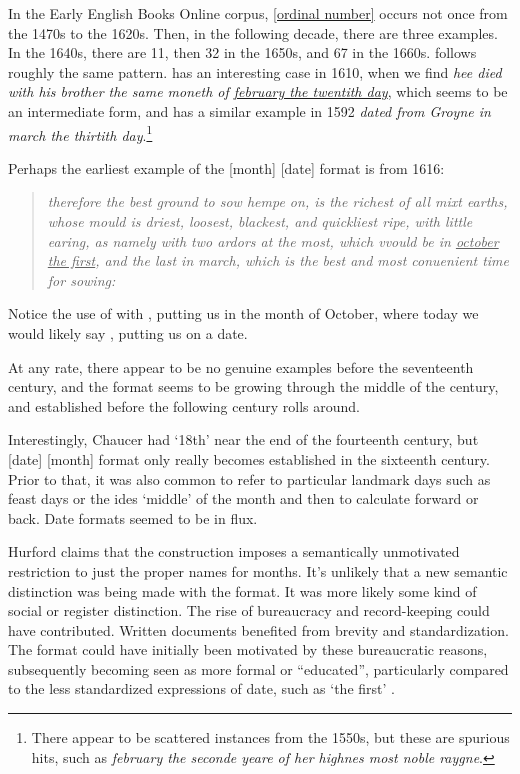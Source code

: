 In the Early English Books Online corpus, \uline{ [ordinal number]} occurs not once from the 1470s to the 1620s. Then, in the following decade, there are three examples. In the 1640s, there are 11, then 32 in the 1650s, and 67 in the 1660s.  follows roughly the same pattern.  has an interesting case in 1610, when we find \textit{hee died with his brother the same moneth of \uline{february the twentith day}}, which seems to be an intermediate form, and  has a similar example in 1592 \textit{dated from Groyne in march the thirtith day}.\footnote{There appear to be scattered instances from the 1550s, but these are spurious hits, such as \textit{february the seconde yeare of her highnes most noble raygne}.}

Perhaps the earliest example of the [month]  [date] format is from 1616: %

\begin{quote}
    \textit{therefore the best ground to sow hempe on, is the richest of all mixt earths, whose mould is driest, loosest, blackest, and quickliest ripe, with little earing, as namely with two ardors at the most, which vvould be in \uline{october the first}, and the last in march, which is the best and most conuenient time for sowing: }
\end{quote}

Notice the use of  with , putting us in the month of October, where today we would likely say , putting us on a date.

At any rate, there appear to be no genuine examples before the seventeenth century, and the format seems to be growing through the middle of the century, and established before the following century rolls around.

Interestingly, Chaucer had  `18th'  near the end of the fourteenth century, but  [date]  [month] format only really becomes established in the sixteenth century. Prior to that, it was also common to refer to particular landmark days such as feast days or the ides `middle' of the month and then to calculate forward or back. Date formats seemed to be in flux.

Hurford claims that the  construction imposes a semantically unmotivated restriction to just the proper names for months. It's unlikely that a new semantic distinction was being made with the  format. It was more likely some kind of social or register distinction. The rise of bureaucracy and record-keeping could have contributed. Written documents benefited from brevity and standardization. The format could have initially been motivated by these bureaucratic reasons, subsequently becoming seen as more formal or \enquote{educated}, particularly compared to the less standardized expressions of date, such as  `the first' .

